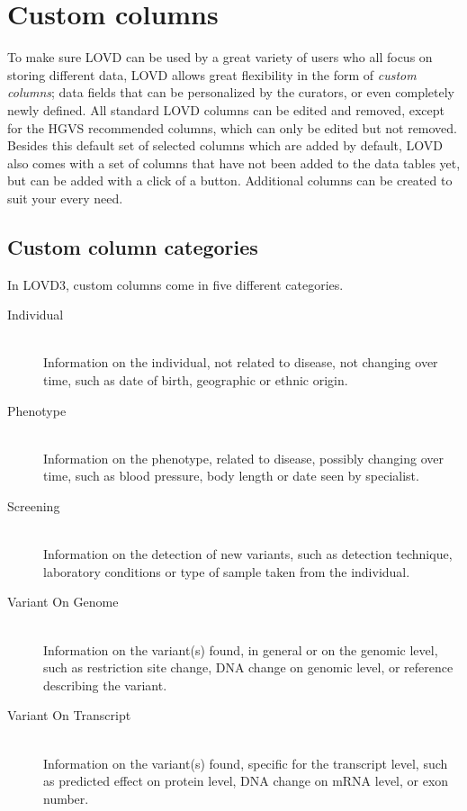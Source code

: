 \documentclass[a4paper,oneside,openany,12pt]{memoir}
\begin{document}
\chapter{Custom columns}
To make sure LOVD can be used by a great variety of users who all focus on storing different data,
 LOVD allows great flexibility in the form of \emph{custom columns}; data fields that can be personalized by the curators,
 or even completely newly defined.
All standard LOVD columns can be edited and removed, except for the HGVS recommended columns,
 which can only be edited but not removed.
Besides this default set of selected columns which are added by default,
 LOVD also comes with a set of columns that have not been added to the data tables yet,
 but can be added with a click of a button.
Additional columns can be created to suit your every need.





\hypertarget{sec:custom_column_categories}{}
\section{Custom column categories}
In LOVD3, custom columns come in five different categories.
\begin{description}
  \item[Individual] \hfill \\
  Information on the individual, not related to disease, not changing over time, such as date of birth, geographic or ethnic origin.
  \item[Phenotype] \hfill \\
  Information on the phenotype, related to disease, possibly changing over time, such as blood pressure, body length or date seen by specialist.
  \item[Screening] \hfill \\
  Information on the detection of new variants, such as detection technique, laboratory conditions or type of sample taken from the individual.
  \item[Variant On Genome] \hfill \\
  Information on the variant(s) found, in general or on the genomic level, such as restriction site change, DNA change on genomic level, or reference describing the variant.
  \item[Variant On Transcript] \hfill \\
  Information on the variant(s) found, specific for the transcript level, such as predicted effect on protein level, DNA change on mRNA level, or exon number.
\end{description}
\end{document}
